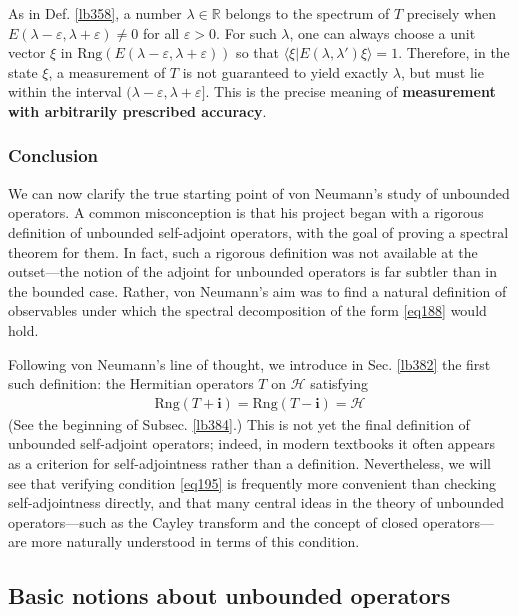 \documentclass[12pt,b5paper,notitlepage]{article}
\theoremstyle{definition}
\theoremstyle{plain}
\newcommand{\bk}[1]{\langle {#1}\rangle}
\newcommand{\im}{\mathbf{i}}
\newcommand{\Rbb}{\mathbb R}
\newcommand{\Rng}{\mathrm{Rng}}
\newcommand{\eps}{\varepsilon}
\newcommand{\MH}{\mathcal H}
\numberwithin{equation}{section}
\begin{document}
As in Def. \ref{lb358}, a number $\lambda\in\Rbb$ belongs to the spectrum of $T$ precisely when $E(\lambda-\eps,\lambda+\eps)\neq0$ for all $\eps>0$. For such $\lambda$, one can always choose a unit vector $\xi$ in $\Rng(E(\lambda-\eps,\lambda+\eps))$ so that $\bk{\xi|E(\lambda,\lambda')\xi}=1$. Therefore, in the state $\xi$, a measurement of $T$ is not guaranteed to yield exactly $\lambda$, but must lie within the interval $(\lambda-\eps,\lambda+\eps]$. This is the precise meaning of \textbf{measurement with arbitrarily prescribed accuracy}.



\subsubsection{Conclusion}



We can now clarify the true starting point of von Neumann's study of unbounded operators. A common misconception is that his project began with a rigorous definition of unbounded self-adjoint operators, with the goal of proving a spectral theorem for them. In fact, such a rigorous definition was not available at the outset---the notion of the adjoint for unbounded operators is far subtler than in the bounded case. Rather, von Neumann's aim was to find a natural definition of observables under which the spectral decomposition of the form \eqref{eq188} would hold.

Following von Neumann's line of thought, we introduce in Sec. \ref{lb382} the first such definition: the Hermitian operators $T$ on $\MH$ satisfying
\begin{align}\label{eq195}
\Rng(T+\im)=\Rng(T-\im)=\MH
\end{align}
(See the beginning of Subsec. \ref{lb384}.) This is not yet the final definition of unbounded self-adjoint operators; indeed, in modern textbooks it often appears as a criterion for self-adjointness rather than a definition. Nevertheless, we will see that verifying condition \eqref{eq195} is frequently more convenient than checking self-adjointness directly, and that many central ideas in the theory of unbounded operators---such as the Cayley transform and the concept of closed operators---are more naturally understood in terms of this condition.


\subsection{Basic notions about unbounded operators}
\end{document}
